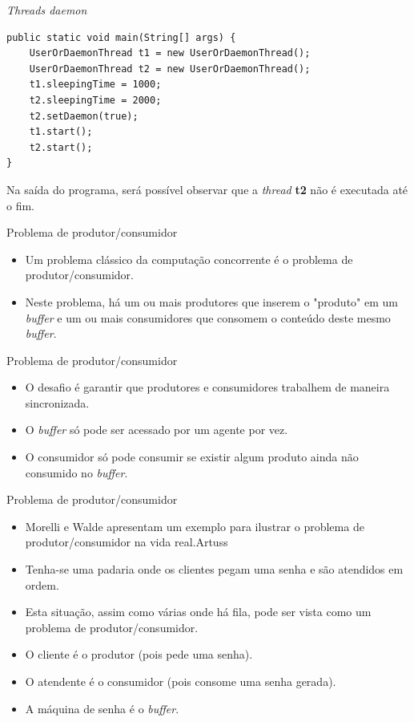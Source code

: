 \documentclass[11pt,justified]{beamer}
\begin{document}
\begin{frame}[fragile]{\textit{Threads daemon}}
    \begin{lstlisting}
public static void main(String[] args) {
    UserOrDaemonThread t1 = new UserOrDaemonThread();
    UserOrDaemonThread t2 = new UserOrDaemonThread();
    t1.sleepingTime = 1000;
    t2.sleepingTime = 2000;
    t2.setDaemon(true);
    t1.start();
    t2.start();
}
    \end{lstlisting}

    Na saída do programa, será possível observar que a \textit{thread} \textbf{t2} não é executada até o fim.
\end{frame}

\begin{frame}{Problema de produtor/consumidor}
    \begin{itemize}
        \item Um problema clássico da computação concorrente é o problema de produtor/consumidor.
        \item Neste problema, há um ou mais produtores que inserem o "produto" em um \textit{buffer} e um ou mais consumidores que consomem o conteúdo deste mesmo \textit{buffer}.
    \end{itemize}
\end{frame}

\begin{frame}{Problema de produtor/consumidor}
    \begin{itemize}
        \item O desafio é garantir que produtores e consumidores trabalhem de maneira sincronizada.
        \item O \textit{buffer} só pode ser acessado por um agente por vez.
        \item O consumidor só pode consumir se existir algum produto ainda não consumido no \textit{buffer}.
    \end{itemize}
\end{frame}

\begin{frame}{Problema de produtor/consumidor}
    \begin{itemize}
        \item Morelli e Walde apresentam um exemplo para ilustrar o problema de produtor/consumidor na vida real.Artuss
        \item Tenha-se uma padaria onde os clientes pegam uma senha e são atendidos em ordem.
        \item Esta situação, assim como várias onde há fila, pode ser vista como um problema de produtor/consumidor.
        \item O cliente é o produtor (pois pede uma senha).
        \item O atendente é o consumidor (pois consome uma senha gerada).
        \item A máquina de senha é o \textit{buffer}.
    \end{itemize}
\end{frame}
\end{document}
